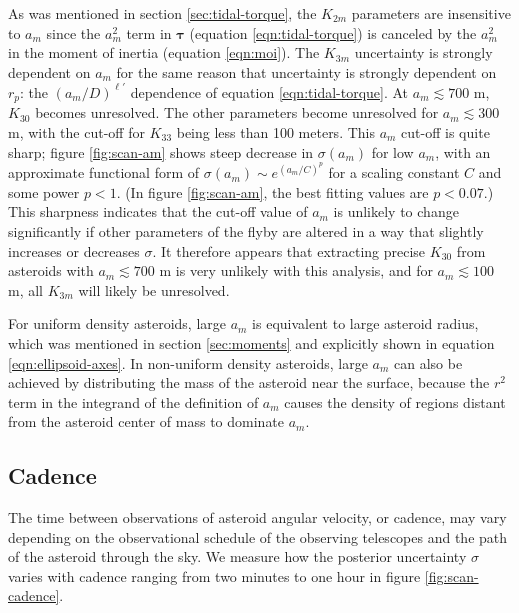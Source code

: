 \documentclass[fleqn,usenatbib]{mnras}
\begin{document}
As was mentioned in section \ref{sec:tidal-torque}, the $K_{2m}$ parameters are insensitive to $a_m$ since the $a_m^2$ term in $\bm \tau$ (equation \ref{eqn:tidal-torque}) is canceled by the $a_m^2$ in the moment of inertia (equation \ref{eqn:moi}). The $K_{3m}$ uncertainty is strongly dependent on $a_m$ for the same reason that uncertainty is strongly dependent on $r_p$: the $(a_m/D)^{\ell'}$ dependence of equation \ref{eqn:tidal-torque}. At $a_m \lesssim 700$ m, $K_{30}$ becomes unresolved. The other parameters become unresolved for $a_m \lesssim 300$ m, with the cut-off for $K_{33}$ being less than 100 meters. This $a_m$ cut-off is quite sharp; figure \ref{fig:scan-am} shows steep decrease in $\sigma(a_m)$ for low $a_m$, with an approximate functional form of $\sigma(a_m) \sim e^{(a_m/C)^p}$ for a scaling constant $C$ and some power $p < 1$. (In figure \ref{fig:scan-am}, the best fitting values are $p < 0.07$.) This sharpness indicates that the cut-off value of $a_m$ is unlikely to change significantly if other parameters of the flyby are altered in a way that slightly increases or decreases $\sigma$. It therefore appears that extracting precise $K_{30}$ from asteroids with $a_m \lesssim 700$ m is very unlikely with this analysis, and for $a_m \lesssim 100$ m, all $K_{3m}$ will likely be unresolved.

For uniform density asteroids, large $a_m$ is equivalent to large asteroid radius, which was mentioned in section \ref{sec:moments} and explicitly shown in equation \ref{eqn:ellipsoid-axes}. In non-uniform density asteroids, large $a_m$ can also be achieved by distributing the mass of the asteroid near the surface, because the $r^2$ term in the integrand of the definition of $a_m$ causes the density of regions distant from the asteroid center of mass to dominate $a_m$.




\subsection{Cadence}
\label{sec:scan-cadence}

The time between observations of asteroid angular velocity, or cadence, may vary depending on the observational schedule of the observing telescopes and the path of the asteroid through the sky.  We measure how the posterior uncertainty $\sigma$ varies with cadence ranging from two minutes to one hour in figure \ref{fig:scan-cadence}.
\end{document}
